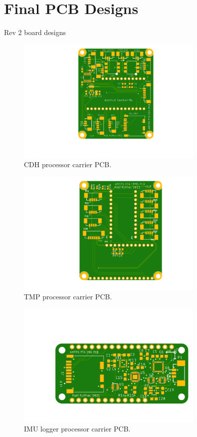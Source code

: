 \documentclass[UKenglish]{beamer}
\begin{document}
\section{Final PCB Designs}
\begin{frame}[allowframebreaks]{Rev 2 board designs}
	
	\begin{figure}[h!]
		\centering
		\includegraphics[width=0.8\textwidth]{images/main_board.png}
		\caption{CDH processor carrier PCB.}
	\end{figure}

	\begin{figure}[h!]
		\centering
		\includegraphics[width=0.8\textwidth]{images/tpms_breakout.png}
		\caption{TMP processor carrier PCB.}
	\end{figure}

	\begin{figure}[h!]
		\centering
		\includegraphics[width=0.8\textwidth]{images/imu_logger.png}
		\caption{IMU logger processor carrier PCB.}
	\end{figure}

\end{frame}
\end{document}

